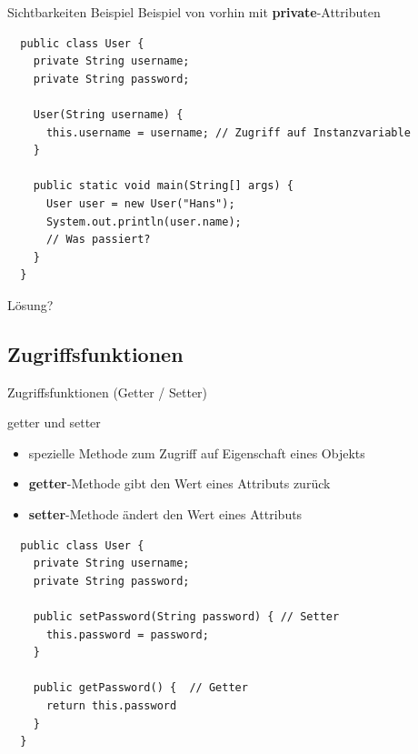 \documentclass[18pt]{beamer}
\begin{document}
\begin{frame}[fragile]{Sichtbarkeiten Beispiel}
  Beispiel von vorhin mit \textbf{private}-Attributen
  \begin{lstlisting}
  public class User {   
    private String username;
    private String password;
    
    User(String username) {
      this.username = username; // Zugriff auf Instanzvariable
    }
    
    public static void main(String[] args) {
      User user = new User("Hans");
      System.out.println(user.name);
      // Was passiert?
    }
  }\end{lstlisting}
  \pause
  Lösung?
\end{frame}

\subsection{Zugriffsfunktionen}
\begin{frame}[fragile]{Zugriffsfunktionen (Getter / Setter)}
	\begin{block}{getter und setter}
    \begin{itemize}
      \item spezielle Methode zum Zugriff auf Eigenschaft eines Objekts
      \item \textbf{getter}-Methode gibt den Wert eines Attributs zurück
      \item \textbf{setter}-Methode ändert den Wert eines Attributs
    \end{itemize}
  \end{block}
   \begin{lstlisting}
  public class User {   
    private String username;
    private String password;
    
    public setPassword(String password) { // Setter
      this.password = password;
    }
    
    public getPassword() {  // Getter
      return this.password
    }
  }\end{lstlisting}
\end{frame}
\end{document}
